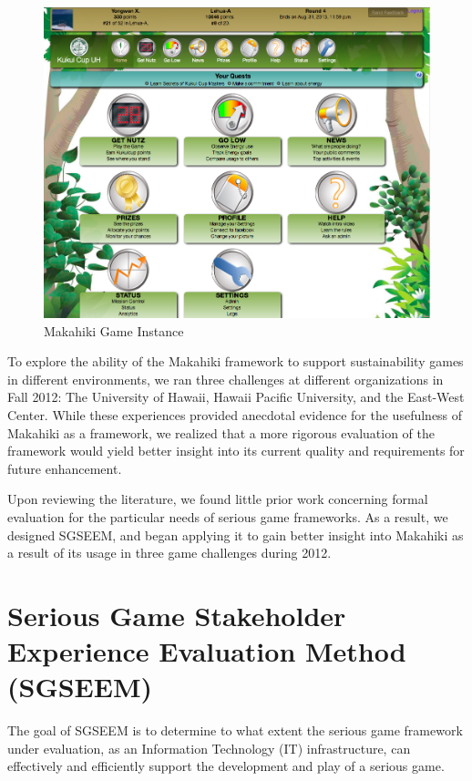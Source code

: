 \documentclass{sigchi}
\begin{document}
\begin{figure}
  \center
  \includegraphics[width=\columnwidth]{kukuicup-home}
  \caption{Makahiki Game Instance}
  \label{fig:Makahiki-Home-Page}
\end{figure}

To explore the ability of the Makahiki framework to support
sustainability games in different environments, we ran three
challenges at different organizations in Fall 2012: The University of
Hawaii, Hawaii Pacific University, and the East-West Center. While
these experiences provided anecdotal evidence for the usefulness of
Makahiki as a framework, we realized that a more rigorous evaluation of the framework
would yield better insight into its current quality and requirements
for future enhancement.

Upon reviewing the literature, we found little prior work concerning formal evaluation for
the particular needs of serious game frameworks. As a result, we designed SGSEEM, and
began applying it to gain better insight into Makahiki as a result of its usage in three
game challenges during 2012.

\section{Serious Game Stakeholder Experience Evaluation Method (SGSEEM)}

The goal of SGSEEM is to determine to what extent the serious game
framework under evaluation, as an Information Technology (IT)
infrastructure, can effectively and efficiently support the
development and play of a serious game.
\end{document}
